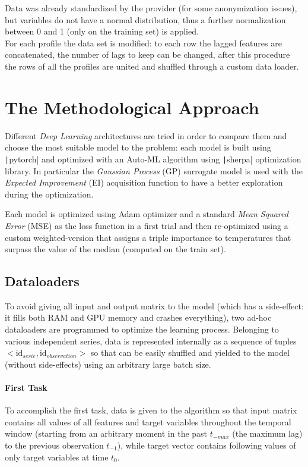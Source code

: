 Data was already standardized by the provider (for some anonymization issues), but variables do not have a normal distribution, thus a further normalization between 0 and 1 (only on the training set) is applied.\\
For each profile the data set is modified: to each row the lagged features are concatenated, the number of lags to keep can be changed, after this procedure the rows of all the profiles are united and shuffled through a custom data loader.

\section{The Methodological Approach}
Different \textit{Deep Learning} architectures are tried in order to compare them and choose the most suitable model to the problem: each model is built using \texttt|pytorch| and optimized with an Auto-ML algorithm using \texttt|sherpa| optimization library. In particular the \textit{Gaussian Process} (GP) surrogate model is used with the \textit{Expected Improvement} (EI) acquisition function to have a better exploration during the optimization.

Each model is optimized using Adam optimizer and a standard \textit{Mean Squared Error} (MSE) as the loss function in a first trial and then re-optimized using a custom weighted-version that assigns a triple importance to temperatures that surpass the value of the median (computed on the train set).

\subsection{Dataloaders}
To avoid giving all input and output matrix to the model (which has a side-effect: it fills both RAM and GPU memory and crashes everything), two ad-hoc dataloaders are programmed to optimize the learning process.
Belonging to various independent series, data is represented internally as a sequence of tuples $<\text{id}_{serie}, \text{id}_{observation}>$ so that can be easily shuffled and yielded to the model (without side-effects) using an arbitrary large batch size.

\paragraph{First Task}
To accomplish the first task, data is given to the algorithm so that input matrix contains all values of all features and target variables throughout the temporal window (starting from an arbitrary moment in the past $t_{-max}$ (the maximum lag) to the previous observation $t_{-1}$), while target vector contains following values of only target variables at time $t_0$.

